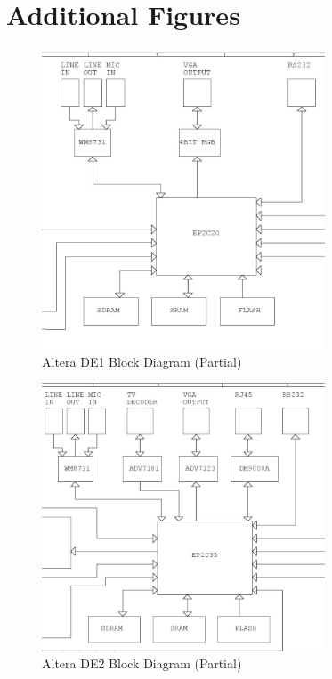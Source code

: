 \documentclass[12pt]{article} %
\begin{document}
\section{Additional Figures} \label{sec:add}
\begin{figure}[h]
\centering
\includegraphics[width=0.75\textwidth]{./images/DE1_schem.jpg}
\caption{Altera DE1 Block Diagram (Partial)}
\label{fig:de1}    
\end{figure}
\begin{figure}[h]
\centering
\includegraphics[width=0.75\textwidth]{./images/DE2_schem.jpg}
\caption{Altera DE2 Block Diagram (Partial)}
\label{fig:de2}    
\end{figure}
\end{document}
